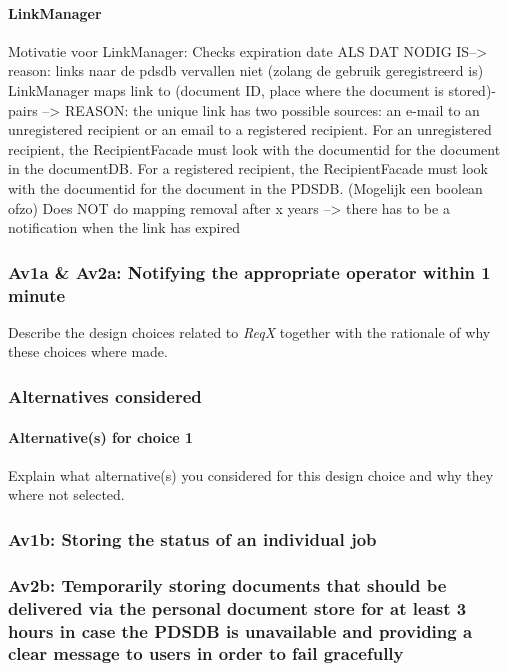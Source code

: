 \documentclass[a4paper,10pt]{article}
\begin{document}
\paragraph{LinkManager}
Motivatie voor LinkManager: Checks expiration date ALS DAT NODIG IS--> reason: links naar de pdsdb vervallen niet (zolang de gebruik geregistreerd is)
LinkManager maps link to (document ID, place where the document is stored)-pairs --> REASON: the unique link has two possible sources: an e-mail to an unregistered recipient or an email to a registered recipient. For an unregistered recipient, the RecipientFacade must look with the documentid for the document in the documentDB. For a registered recipient, the RecipientFacade must look with the documentid for the document  in the PDSDB. (Mogelijk een boolean ofzo)
Does NOT do mapping removal after x years --> there has to be a notification when the link has expired

\subsubsection{Av1a \& Av2a\@: Notifying the appropriate operator within 1 minute}\label{subsubsec:Av1a-Av2a}
Describe the design choices related to \emph{ReqX} together with the rationale
of why these choices where made.
\subsubsection*{Alternatives considered}
\paragraph{Alternative(s) for choice 1} Explain what alternative(s) you
considered for this design choice and why they where not selected.

\subsubsection{Av1b\@: Storing the status of an individual job}\label{subsubsec:Av1b}

\subsubsection{Av2b\@: Temporarily storing documents that should be delivered via the personal document store for at least 3 hours in case the PDSDB is unavailable and providing a clear message to users in order to fail gracefully}\label{subsubsec:Av2b}
\end{document}
